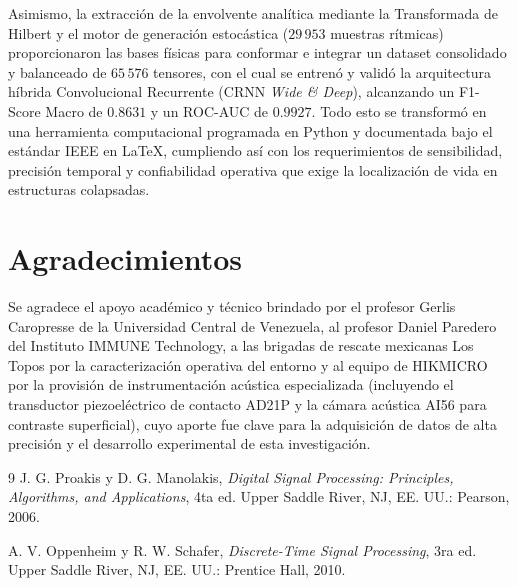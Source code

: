 \documentclass[journal, a4paper]{IEEEtran}
\begin{document}
Asimismo, la extracción de la envolvente analítica mediante la Transformada de Hilbert y el motor de generación estocástica ($29\,953$ muestras rítmicas) proporcionaron las bases físicas para conformar e integrar un dataset consolidado y balanceado de $65\,576$ tensores, con el cual se entrenó y validó la arquitectura híbrida Convolucional Recurrente (CRNN \textit{Wide \& Deep}), alcanzando un F1-Score Macro de $0.8631$ y un ROC-AUC de $0.9927$. Todo esto se transformó en una herramienta computacional programada en Python y documentada bajo el estándar IEEE en \LaTeX{}, cumpliendo así con los requerimientos de sensibilidad, precisión temporal y confiabilidad operativa que exige la localización de vida en estructuras colapsadas.

\section*{Agradecimientos}
Se agradece el apoyo académico y técnico brindado por el profesor Gerlis Caropresse de la Universidad Central de Venezuela, al profesor Daniel Paredero del Instituto IMMUNE Technology, a las brigadas de rescate mexicanas Los Topos por la caracterización operativa del entorno y al equipo de HIKMICRO por la provisión de instrumentación acústica especializada (incluyendo el transductor piezoeléctrico de contacto AD21P y la cámara acústica AI56 para contraste superficial), cuyo aporte fue clave para la adquisición de datos de alta precisión y el desarrollo experimental de esta investigación.
\begin{thebibliography}{9}
    J. G. Proakis y D. G. Manolakis, \textit{Digital Signal Processing: Principles, Algorithms, and Applications}, 4ta ed. Upper Saddle River, NJ, EE. UU.: Pearson, 2006.
    
    A. V. Oppenheim y R. W. Schafer, \textit{Discrete-Time Signal Processing}, 3ra ed. Upper Saddle River, NJ, EE. UU.: Prentice Hall, 2010.
\end{thebibliography}
\end{document}
